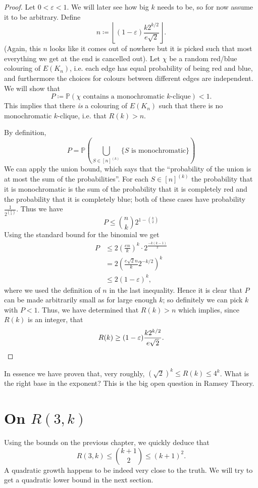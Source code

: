 \documentclass{report}
\theoremstyle{definition}
\theoremstyle{plain}
\theoremstyle{definition}
\begin{document}
	\begin{proof}
		Let $0<\varepsilon <1$. We will later see how big $k$ needs to be, so for now assume it to be arbitrary. Define
		\[
			n \coloneqq \left\lfloor (1-\varepsilon)\frac{k2^{k/2}}{e\sqrt{2}}\right\rfloor.
		\]
		(Again, this $n$ looks like it comes out of nowhere but it is picked such that most everything we get at the end is cancelled out). Let $\chi$ be a random red/blue colouring of $E(K_n)$, i.e. each edge has equal probability of being red and blue, and furthermore the choices for colours between different edges are independent. We will show that
		\[
			P \coloneqq \mathbb{P}(\chi \text{ contains a monochromatic $k$-clique}) < 1.
		\]
		This implies that there \emph{is} a colouring of $E(K_n)$ such that there is no monochromatic $k$-clique, i.e. that $R(k) > n$.
		
		By definition,
		\begin{equation*}
			P = \mathbb{P}\left(\bigcup_{S\in[n]^{(k)}} \{S \text{ is monochromatic}\}\right)
		\end{equation*}
		We can apply the union bound, which says that the ``probability of the union is at most the sum of the probabilities''. For each $S\in [n]^(k)$ the probability that it is monochromatic is the sum of the probability that it is completely red and the probability that it is completely blue; both of these cases have probability $\frac{1}{2^{\binom{k}{2}}}$. Thus we have
		\[
			P \leq \binom{n}{k}2^{1-\binom{k}{2}}
		\]
		Using the standard bound for the binomial we get
		\begin{align*}
			P &\leq 2\left(\frac{en}{k}\right)^k\cdot 2^{\frac{-k(k-1)}{2}}\\
			&= 2\left(\frac{e\sqrt{2}n}{k}2^{-k/2}\right)^k\\
			&\leq 2(1-\varepsilon)^k,
		\end{align*}
		where we used the definition of $n$ in the last inequality. Hence it is clear that $P$ can be made arbitrarily small as for large enough $k$; so definitely we can pick $k$ with $P<1$. Thus, we have determined that $R(k)>n$ which implies, since $R(k)$ is an integer, that
		\[
			R(k)\geq (1-\varepsilon)\frac{k2^{k/2}}{e\sqrt{2}}.\qedhere
		\]
	\end{proof}
	In essence we have proven that, very roughly, $(\sqrt{2})^k \leq R(k) \leq 4^k$. What is the right base in the exponent? This is the big open question in Ramsey Theory.
	\chapter{On $R(3,k)$}
	Using the bounds on the previous chapter, we quickly deduce that
	\[
		R(3,k) \leq \binom{k+1}{2} \leq (k+1)^2.
	\]
	A quadratic growth happens to be indeed very close to the truth. We will try to get a quadratic lower bound in the next section. 
\end{document}
